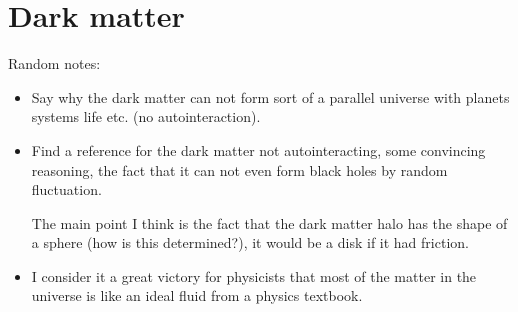 \chapter{Dark matter}

Random notes:

\begin{itemize}

    \item Say why the dark matter can not form sort of a parallel universe with
    planets systems life etc. (no autointeraction).
    
    \item Find a reference for the dark matter not autointeracting, some
    convincing reasoning, the fact that it can not even form black holes by
    random fluctuation.
    
    The main point I think is the fact that the dark matter halo has the shape
    of a sphere (how is this determined?), it would be a disk if it had
    friction.
    
    \item I consider it a great victory for physicists that most of the matter
    in the universe is like an ideal fluid from a physics textbook.

\end{itemize}

